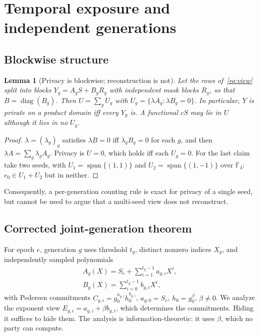 \documentclass[pdflatex,sn-mathphys-num,twocolumn]{sn-jnl}
\theoremstyle{plain}
\newtheorem{lemma}[theorem]{Lemma}
\theoremstyle{definition}
\newcommand{\F}{\mathbb{F}}
\begin{document}
\section{Temporal exposure and independent generations}\label{sec:temporal}

\subsection{Blockwise structure}
\begin{lemma}[Privacy is blockwise; reconstruction is not]\label{lem:block}
Let the rows of~\eqref{eq:view} split into blocks $Y_g=A_gS+B_gR_g$ with independent mask blocks $R_g$, so that $B=\operatorname{diag}(B_g)$. Then $U=\sum_gU_g$ with $U_g=\{\lambda A_g:\lambda B_g=0\}$. In particular, $Y$ is private on a product domain iff every $Y_g$ is. A functional $cS$ may lie in $U$ although it lies in no $U_g$.
\end{lemma}
\begin{proof}
$\lambda=(\lambda_g)_g$ satisfies $\lambda B=0$ iff $\lambda_gB_g=0$ for each $g$, and then $\lambda A=\sum_g\lambda_gA_g$. Privacy is $U=0$, which holds iff each $U_g=0$. For the last claim take two seeds, with $U_1=\operatorname{span}\{(1,1)\}$ and $U_2=\operatorname{span}\{(1,-1)\}$ over $\F_3$: $e_0\in U_1+U_2$ but in neither.
\end{proof}

Consequently, a per-generation counting rule is exact for privacy of a single seed, but cannot be used to argue that a multi-seed view does not reconstruct.

\subsection{Corrected joint-generation theorem}
For epoch $e$, generation $g$ uses threshold $t_g$, distinct nonzero indices $X_g$, and independently sampled polynomials
\begin{equation}\label{eq:sharing}
\begin{gathered}
 A_g(X)=S_e+\sum_{i=1}^{t_g-1}a_{g,i}X^i,\\
 B_g(X)=\sum_{i=0}^{t_g-1}b_{g,i}X^i,
\end{gathered}
\end{equation}
with Pedersen commitments $C_{g,i}=g_0^{a_{g,i}}h_0^{b_{g,i}}$, $a_{g,0}=S_e$, $h_0=g_0^\beta$, $\beta\ne0$. We analyze the exponent view $E_{g,i}=a_{g,i}+\beta b_{g,i}$, which determines the commitments. Hiding it suffices to hide them. The analysis is information-theoretic: it uses $\beta$, which no party can compute.
\end{document}
